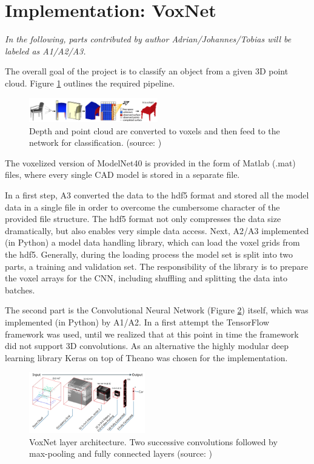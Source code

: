 \documentclass[10pt,twocolumn,letterpaper]{article}
\begin{document}
\section{Implementation: VoxNet \cite{voxnet}}

\textit{In the following, parts contributed by author Adrian/Johannes/Tobias will be labeled 
as A1/A2/A3.}\newline

The overall goal of the project is to classify an object from a given 3D point cloud. Figure \ref{fig:algo} outlines 
the required pipeline.

\begin{figure}[h]
	\label{fig:algo}
	\centering
	\includegraphics[width=0.5\textwidth]{figures/algo}
	\caption{ Depth and point cloud are converted to voxels and then feed to the network 
	for classification. (source: \cite{shape})}
\end{figure}

The voxelized version of ModelNet40 is provided in the form of Matlab (.mat) files, where every single CAD model is stored 
in a separate file.

In a first step, A3 converted the data to the hdf5 format and stored all the model data in a single file in order to overcome 
the cumbersome character of the provided file structure. The hdf5 format not only compresses the data size dramatically, but also enables
very simple data access. 
Next, A2/A3 implemented (in Python) a model data handling library, which can load the voxel grids from the hdf5. Generally, during the loading 
process the model set is split into two parts, a training and validation set. The responsibility of the library is to prepare 
the voxel arrays for the CNN, including shuffling and splitting the data into batches.

The second part is the Convolutional Neural Network (Figure \ref{fig:voxnet_structure}) itself, which was implemented (in Python) by A1/A2.
In a first attempt the TensorFlow framework was used, until we realized that at this point in time the framework 
did not support 3D convolutions. As an alternative the highly modular deep learning library Keras on top of Theano
was chosen for the implementation.

\begin{figure}[h]
	\label{fig:voxnet_structure}
	\centering
	\includegraphics[width=0.45\textwidth]{figures/model}
	\caption{VoxNet layer architecture. Two successive convolutions followed by 
	max-pooling and fully connected layers (source: \cite{mature})}
\end{figure}
\end{document}
